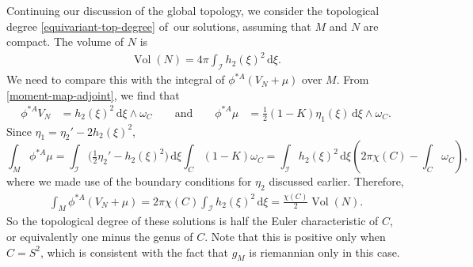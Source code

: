 \documentclass[10pt,a4paper]{amsart}
\newcommand{\II}{{\mathcal{I}}}
\newcommand{\1}{{\mathbb{1}}}
\def \d{\mathrm{d}}
\numberwithin{equation}{section}
\begin{document}
Continuing our discussion of the global topology, we consider the topological degree \eqref{equivariant-top-degree} of~our solutions, assuming that $M$ and $N$ are compact. The volume of $N$ is
\begin{align*}
\operatorname{Vol}(N)=4\pi\int_\II h_2(\xi)^2\,\d\xi.
\end{align*}
We need to compare this with the integral of $\phi^{\ast A}(V_N+\mu)$ over $M$. From \eqref{moment-map-adjoint}, we find that
\begin{equation*}
\begin{aligned}
\phi^{\ast A}V_N &= h_2(\xi)^2\,\d\xi\wedge\omega_C \qquad\text{and}\qquad
\phi^{\ast A}\mu &= \tfrac{1}{2}(1-K)\eta_1(\xi)\,\d\xi\wedge\omega_C.
\end{aligned}
\end{equation*}
Since $\eta_1=\eta_2'-2h_2(\xi)^2$,
\begin{equation*}
\int_M \phi^{\ast A}\mu = \int_\II \bigl(\tfrac12\eta_2'-h_2(\xi)^2\bigr)\,\d\xi\int_C(1-K)\omega_C= \int_\II h_2(\xi)^2 \,\d\xi\left(2\pi\chi(C)-\int_C\omega_C\right),
\end{equation*}
where we made use of the boundary conditions for $\eta_2$ discussed earlier. Therefore,
\begin{align*}
\int_M \phi^{\ast A}(V_N+\mu) = 2\pi\chi(C)\int_\II h_2(\xi)^2\,\d\xi = \frac{\chi(C)}{2}\operatorname{Vol}(N).
\end{align*}
So the topological degree of these solutions is half the Euler characteristic of $C$, or equivalently one minus the genus of $C$. Note that this is positive only when $C=S^2$, which is consistent with the fact that $g_M$ is riemannian only in this case.
\end{document}
